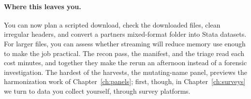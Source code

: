 \documentclass[
    a4paper,
    fontsize=10pt,
    twoside=true,
    numbers=noenddot,
]{kaobook}
\begin{document}
\paragraph{Where this leaves you.} You can now plan a scripted download, check the downloaded files, clean irregular headers, and convert a partner\textquotesingle s mixed-format folder into Stata datasets. For larger files, you can assess whether streaming will reduce memory use enough to make the job practical. The recon pass, the manifest, and the triage read each cost minutes, and together they make the rerun an afternoon instead of a forensic investigation. The hardest of the harvests, the mutating-name panel, previews the harmonization work of Chapter~\ref{ch:panels}; first, though, in Chapter~\ref{ch:surveys} we turn to data you collect yourself, through survey platforms.
\end{document}
